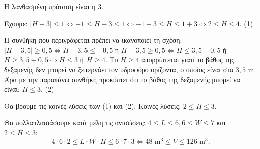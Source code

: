 
\begin{alist}
\item Η λανθασμένη πρόταση είναι η 3.
\item Έχουμε:
$|H - 3| \le 1 \Leftrightarrow -1 \le H - 3 \le 1 \Leftrightarrow -1 + 3 \le H \le 1 + 3 \Leftrightarrow 2 \le H \le 4$. (1)
\item Η συνθήκη που περιγράφεται πρέπει να ικανοποιεί τη σχέση:
$|H - 3,5| \ge 0,5 \Leftrightarrow H - 3,5 \le -0,5$ ή $H - 3,5 \ge 0,5 \Leftrightarrow H \le 3,5 - 0,5$ ή $H \ge 3,5 + 0,5 \Leftrightarrow H \le 3$ ή $H \ge 4$.
Το $H \ge 4$ απορρίπτεται γιατί το βάθος της δεξαμενής δεν μπορεί να ξεπερνάει τον υδροφόρο ορίζοντα, ο οποίος είναι στα $3,5\text{ m}$. Άρα με την παραπάνω συνθήκη προκύπτει ότι το βάθος της δεξαμενής μπορεί να είναι: $H \le 3$. (2)
\item Θα βρούμε τις κοινές λύσεις των (1) και (2):
Κοινές λύσεις: $2 \le H \le 3$.
\item Θα πολλαπλασιάσουμε κατά μέλη τις ανισώσεις: $4 \le L \le 6, 6 \le W \le 7$ και $2 \le H \le 3$:
\[4 \cdot 6 \cdot 2 \le L \cdot W \cdot H \le 6 \cdot 7 \cdot 3 \Leftrightarrow 48\text{ m}^3 \le V \le 126\text{ m}^3.\]
\end{alist}

